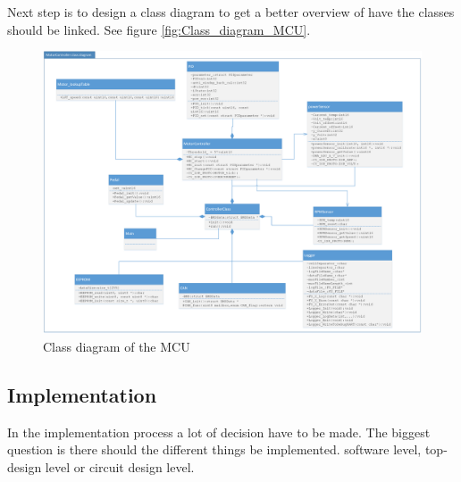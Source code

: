 Next step is to design a class diagram to get a better overview of have the classes should be linked. See figure \vref{fig:Class_diagram_MCU}.

\begin{figure}[H]
	\centering
	\includegraphics [width=6in]{../Documentation_AU2/Software/Pictures/class-diagram.png}
	\caption{Class diagram of the MCU}
	\label{fig:Class_diagram_MCU}
\end{figure}

\subsection{Implementation}

In the implementation process a lot of decision have to be made. The biggest question is there should the different things be implemented. software level, top-design level or circuit design level. \\

